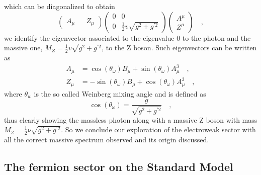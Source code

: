 which can be diagonalized to obtain
\begin{equation}
\begin{pmatrix}
A_\mu && Z_\mu 
\end{pmatrix} \begin{pmatrix}
0  & 0 \\
0  & \frac{1}{2} v \sqrt{g^2 + g^{\prime 2}} 
\end{pmatrix}  \begin{pmatrix}
A^\mu \\ Z^\mu
\end{pmatrix}  \quad , 
\end{equation}
%
we identify the eigenvector associated to the eigenvalue 0 to the photon and the massive one, $ M_Z =  \frac{1}{2} v \sqrt{g^2 + g^{\prime 2}} $, to the Z boson. Such eigenvectors can be written as
%
\begin{align}
A_\mu &=\cos(\theta_\omega) B_\mu + \sin(\theta_\omega) A_\mu^3 \quad ,  \\  
Z_\mu & =- \sin(\theta_\omega) B_\mu + \cos(\theta_\omega) A_\mu^3 \quad , 
\end{align}
%
where $\theta_w$ is the so called Weinberg mixing angle and is defined as
\begin{equation}
\cos(\theta_\omega)=\frac{g}{ \sqrt{g^2 + g^{\prime 2}}} \quad , 
\end{equation}
thus clearly showing the massless photon along with a massive Z boson with mass $M_Z= \frac{1}{2} \nu \sqrt{g^2 + g^{\prime 2}} $. 
%
So we conclude our exploration of the electroweak sector with all the correct massive spectrum observed and its origin discussed.


\subsection{The fermion sector on the Standard Model}

